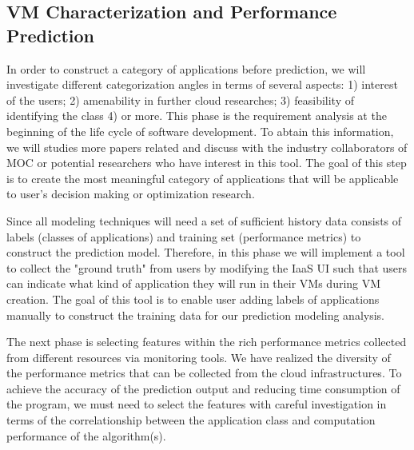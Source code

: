 \subsection{VM Characterization and Performance Prediction}

In order to construct a category of applications before prediction, we will investigate different categorization angles in terms of several aspects: 1) interest of the users; 2) amenability in further cloud researches; 3) feasibility of identifying the class 4) or more. This phase is the requirement analysis at the beginning of the life cycle of software development. To abtain this information, we will studies more papers related and discuss with the industry collaborators of MOC or potential researchers who have interest in this tool. The goal of this step is to create the most meaningful category of applications that will be applicable to user's decision making or optimization research.

Since all modeling techniques will need a set of sufficient history data consists of labels (classes of applications) and training set (performance metrics) to construct the prediction model. Therefore, in this phase we will implement a tool to collect the "ground truth" from users by modifying the IaaS UI such that users can indicate what kind of application they will run in their VMs during VM creation. The goal of this tool is to enable user adding labels of applications manually to construct the training data for our prediction modeling analysis.

The next phase is selecting features within the rich performance metrics collected from different resources via monitoring tools. We have realized the diversity of the performance metrics that can be collected from the cloud infrastructures. To achieve the accuracy of the prediction output and reducing time consumption of the program, we must need to select the features with careful investigation in terms of the correlationship between the application class and computation performance of the algorithm(s).
